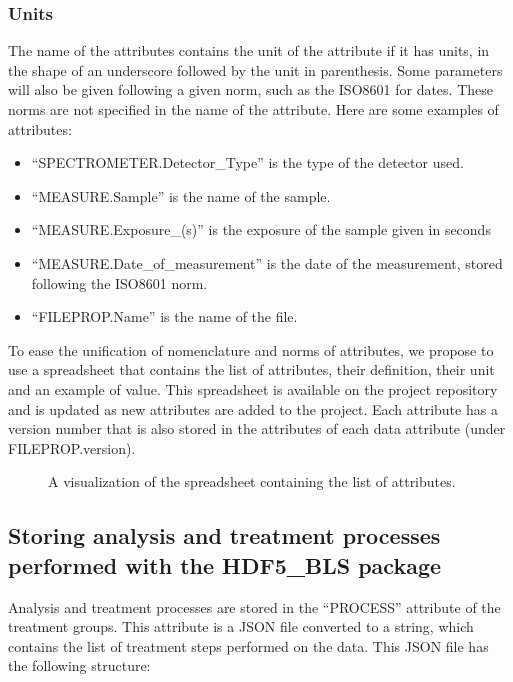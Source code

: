 \documentclass[letterpaper,10pt,english]{sphinxmanual}
\begin{document}
\subsubsection{Units}
\label{\detokenize{source/normalization:units}}
\sphinxAtStartPar
The name of the attributes contains the unit of the attribute if it has units, in the shape of an underscore followed by the unit in parenthesis. Some parameters will also be given following a given norm, such as the ISO8601 for dates. These norms are not specified in the name of the attribute. Here are some examples of attributes:
\begin{itemize}
\item {} 
\sphinxAtStartPar
“SPECTROMETER.Detector\_Type” is the type of the detector used.

\item {} 
\sphinxAtStartPar
“MEASURE.Sample” is the name of the sample.

\item {} 
\sphinxAtStartPar
“MEASURE.Exposure\_(s)” is the exposure of the sample given in seconds

\item {} 
\sphinxAtStartPar
“MEASURE.Date\_of\_measurement” is the date of the measurement, stored following the ISO8601 norm.

\item {} 
\sphinxAtStartPar
“FILEPROP.Name” is the name of the file.

\end{itemize}

\sphinxAtStartPar
To ease the unification of nomenclature and norms of attributes, we propose to use a spreadsheet that contains the list of attributes, their definition, their unit and an example of value. This spreadsheet is available on the project repository and is updated as new attributes are added to the project. Each attribute has a version number that is also stored in the attributes of each data attribute (under FILEPROP.version).

\begin{figure}[htbp]
\centering
\capstart

\noindent{}
\caption{A visualization of the spreadsheet containing the list of attributes.}\label{\detokenize{source/normalization:id2}}\end{figure}


\subsection{Storing analysis and treatment processes performed with the HDF5\_BLS package}
\label{\detokenize{source/normalization:storing-analysis-and-treatment-processes-performed-with-the-hdf5-bls-package}}
\sphinxAtStartPar
Analysis and treatment processes are stored in the “PROCESS” attribute of the treatment groups. This attribute is a JSON file converted to a string, which contains the list of treatment steps performed on the data. This JSON file has the following structure:
\end{document}
